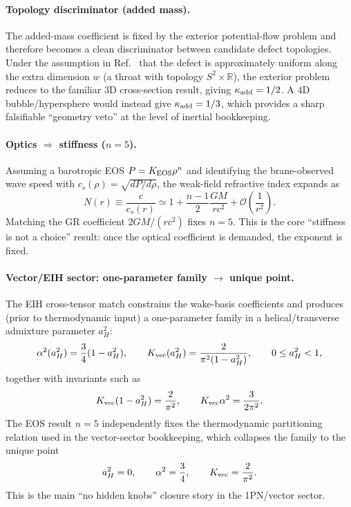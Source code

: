 \documentclass[11pt]{article}
\begin{document}
\paragraph{Topology discriminator (added mass).}
The added-mass coefficient is fixed by the exterior potential-flow problem and therefore becomes a clean discriminator between candidate defect topologies.
Under the assumption in Ref.~\cite{norris2026_4d_model} that the defect is approximately uniform along the extra dimension \(w\) (a throat with topology \(S^2\times\mathbb R\)), the exterior problem reduces to the familiar \(3\)D cross-section result, giving \(\kappa_{\rm add}=1/2\).
A \(4\)D bubble/hypersphere would instead give \(\kappa_{\rm add}=1/3\), which provides a sharp falsifiable ``geometry veto'' at the level of inertial bookkeeping.

\paragraph{Optics \(\Rightarrow\) stiffness (\(n=5\)).}
Assuming a barotropic EOS \(P=K_{\rm EOS}\rho^n\) and identifying the brane-observed wave speed with \(c_s(\rho)=\sqrt{dP/d\rho}\), the weak-field refractive index expands as
\[
N(r)\equiv \frac{c}{c_s(r)}
\simeq 1 + \frac{n-1}{2}\frac{GM}{rc^2} + \mathcal{O}\!\left(\frac{1}{r^2}\right).
\]
Matching the GR coefficient \(2GM/(rc^2)\) fixes \(n=5\). This is the core ``stiffness is not a choice'' result: once the optical coefficient is demanded, the exponent is fixed.

\paragraph{Vector/EIH sector: one-parameter family \(\to\) unique point.}
The EIH cross-tensor match constrains the wake-basis coefficients and produces (prior to thermodynamic input) a one-parameter family in a helical/transverse admixture parameter \(a_H^2\):
\[
\alpha^2(a_H^2)=\frac{3}{4}(1-a_H^2),
\qquad
K_{\rm vec}(a_H^2)=\frac{2}{\pi^2(1-a_H^2)},
\qquad
0\le a_H^2<1,
\]
together with invariants such as
\[
K_{\rm vec}(1-a_H^2)=\frac{2}{\pi^2},
\qquad
K_{\rm vec}\alpha^2=\frac{3}{2\pi^2}.
\]
The EOS result \(n=5\) independently fixes the thermodynamic partitioning relation used in the vector-sector bookkeeping, which collapses the family to the unique point
\[
a_H^2=0,\qquad \alpha^2=\frac{3}{4},\qquad K_{\rm vec}=\frac{2}{\pi^2}.
\]
This is the main ``no hidden knobs'' closure story in the 1PN/vector sector.
\end{document}

